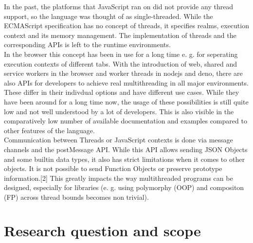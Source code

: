 In the past, the platforms that JavaScript ran on did not provide any thread
support, so the language was thought of as single-threaded. While the
ECMAScript specification has no concept of threads, it specifies realms,
execution context and its memory management. The implementation of threads and
the corresponding APIs is left to the runtime environments.\\

In the browser this concept has been in use for a long time e. g. for
seperating execution contexts of different tabs. With the introduction of web,
shared and service workers in the browser and worker threads in nodejs and
deno, there are also APIs for developers to achieve real multithreading in all
major environments. These differ in their indivdual options and have different
use cases. While they have been around for a long time now, the usage of these
possibilities is still quite low and not well understood by a lot of
developers. This is also visible in the comparatively low number of available
documentation and examples compared to other features of the language.\\

Communication between Threads or JavaScript contexts is done via message
channels and the postMessage API. While this API allows sending JSON Objects
and some builtin data types, it also has strict limitations when it comes to
other objects. It is not possible to send Function Objects or preserve
prototype information.[2] This greatly impacts the way multithreaded programs
can be designed, especially for libraries (e. g. using polymorphy (OOP) and
compositon (FP) across thread bounds becomes non trivial). \\

\section{Research question and scope}

